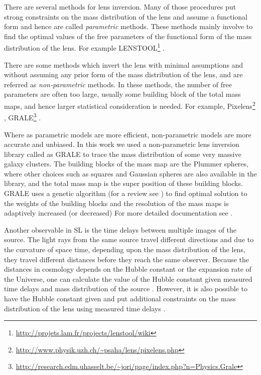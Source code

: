 There are 
several methods for lens inversion. Many of those procedures put strong constraints
on the mass distribution of the lens and assume a functional form and hence are called
{\it parametric} methods. These methods mainly involve to find the optimal values 
of the free parameters of the functional form of the mass distribution of the lens. 
For example LENSTOOL\footnote{\url{http://projets.lam.fr/projects/lenstool/wiki}} 
\cite{2011ascl.soft02004K}.

There are some methods which invert the lens with minimal assumptions and without
assuming any prior form of the mass distribution of the lens, and are referred as
{\it non-parametric} methods. In these methods, the number of free parameters are often
too large, usually some building block of the total mass maps, and hence larger
statistical consideration is needed. For example, 
Pixelens\footnote{\url{http://www.physik.uzh.ch/~psaha/lens/pixelens.php}} 
\cite{2011ascl.soft02007S}, 
GRALE\footnote{\url{http://research.edm.uhasselt.be/~jori/page/index.php?n=Physics.Grale}}
\cite{2006MNRAS.367.1209L}.

Where as parametric models are more efficient, non-parametric models are more
accurate and unbiased. In this work we used a non-parametric lens inversion
library called as GRALE \cite{2006MNRAS.367.1209L,2007MNRAS.380.1729L,2009MNRAS.397..341L} 
to trace the mass distribution of some very massive
galaxy clusters. The building blocks of the mass map are the Plummer spheres, where
other choices such as squares and Gaussian spheres are also available in the library, 
and the total mass map is the super position of these building blocks. GRALE uses
a genetic algorithm (for a review see \citep{1995ApJS..101..309C}) 
to find optimal solution to the weights of the building 
blocks and the resolution of the mass maps is adaptively increased (or decreased)
For more detailed documentation see \cite{2009MNRAS.397..341L}.

Another observable in SL is the time delays between multiple images
of the source. The light rays from the same source travel different directions
and due to the curvature of space time, depending upon the mass distribution 
of the lens, they travel different distances before they reach the same 
observer. Because the distances in cosmology depends on the Hubble constant
or the expansion rate of the Universe, one can calculate the value of the
Hubble constant given measured time delays and mass distribution of the source
\cite{2004tomu.conf..231R}. 
However, it is also possible to have the Hubble constant given and put
additional constraints on the mass distribution of the lens using measured
time delays \cite{2015PASJ...67...21M}.



